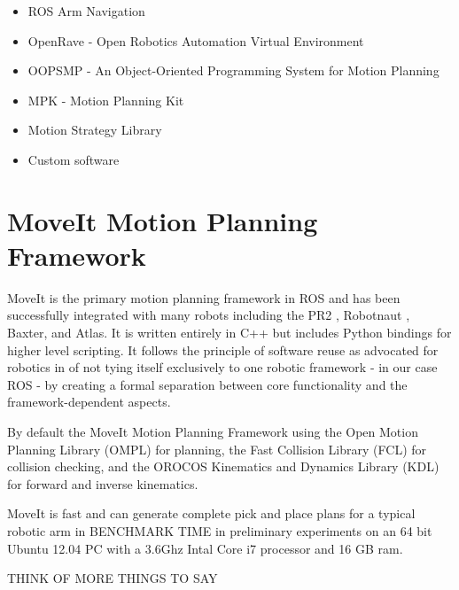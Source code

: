 \documentclass[10pt,journal,compsoc]{joser1}
\begin{document}
{\begin{itemize}
    \item ROS Arm Navigation
    \item OpenRave - Open Robotics Automation Virtual Environment
    \item OOPSMP - An Object-Oriented Programming System for Motion Planning
    \item MPK - Motion Planning Kit
    \item Motion Strategy Library
    \item Custom software
\end{itemize}

\section{MoveIt Motion Planning Framework}
\label{sec::moveit}

MoveIt is the primary motion planning framework in ROS and has been successfully integrated with many robots including the PR2 \cite{wyrobek2008towards}, Robotnaut \cite{ambrose2000robonaut}, Baxter, and Atlas. It is written entirely in C++ but includes Python bindings for higher level scripting. It follows the principle of software reuse as advocated for robotics in \cite{makarenko2007benefits} of not tying itself exclusively to one robotic framework - in our case ROS - by creating a formal separation between core functionality and the framework-dependent aspects. 

By default the MoveIt Motion Planning Framework using the Open Motion Planning Library (OMPL) \cite{sucan2012the-open-motion-planning-library} for planning, the Fast Collision Library (FCL) \cite{fcl} for collision checking, and the OROCOS Kinematics and Dynamics Library (KDL) \cite{kdl} for forward and inverse kinematics. 

MoveIt is fast and can generate complete pick and place plans for a typical robotic arm in BENCHMARK TIME in preliminary experiments on an 64 bit Ubuntu 12.04 PC with a 3.6Ghz Intal Core i7 processor and 16 GB ram.

THINK OF MORE THINGS TO SAY

}
\end{document}
